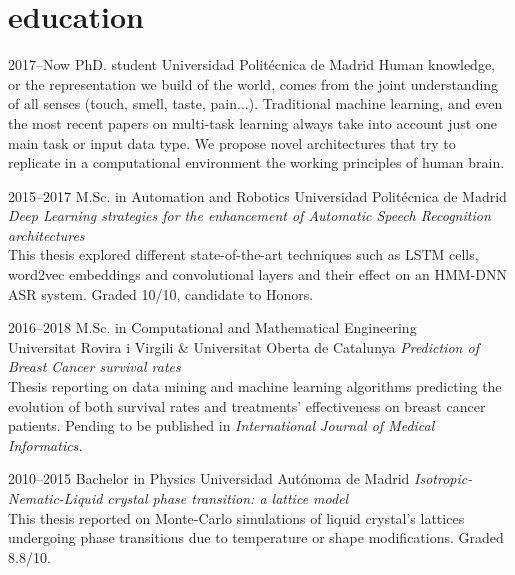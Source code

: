 \documentclass[]{friggeri-cv-a4}
\begin{document}

\section{education}

\begin{entrylist}


\entry
{2017--Now}
{PhD. student}
{Universidad Politécnica de Madrid}
{\small{Human knowledge, or the representation we build of the world, comes from the joint understanding of all senses (touch, smell, taste, pain...). Traditional machine learning, and even the most recent papers on multi-task learning always take into account just one main task or input data type. We propose novel architectures that try to replicate in a computational environment the working principles of human brain.}}


\entry
{2015--2017}
{M.Sc. {\normalfont in Automation and Robotics}}
{Universidad Politécnica de Madrid}
{\small{\emph{Deep Learning strategies for the enhancement of Automatic Speech Recognition architectures} }\\ This thesis explored different state-of-the-art techniques such as LSTM cells, word2vec embeddings and convolutional layers and their effect on an HMM-DNN ASR system. Graded 10/10, candidate to Honors.}


\entry
{2016--2018}
{M.Sc. {\normalfont in Computational and Mathematical Engineering}}
{\\Universitat Rovira i Virgili \& Universitat Oberta de Catalunya}
{\small{\emph{Prediction of Breast Cancer survival rates}} \\ Thesis reporting on data mining and machine learning algorithms predicting the evolution of both survival rates and treatments' effectiveness on breast cancer patients. Pending to be published in \emph{International Journal of Medical Informatics. }}


\entry
{2010--2015}
{Bachelor {\normalfont in Physics}}
{Universidad Autónoma de Madrid}
{\small{\emph{Isotropic-Nematic-Liquid crystal phase transition: a lattice model}} \\ This thesis reported on Monte-Carlo simulations of liquid crystal's lattices undergoing phase transitions due to temperature or shape modifications. Graded 8.8/10.}


\end{entrylist}
\end{document}
